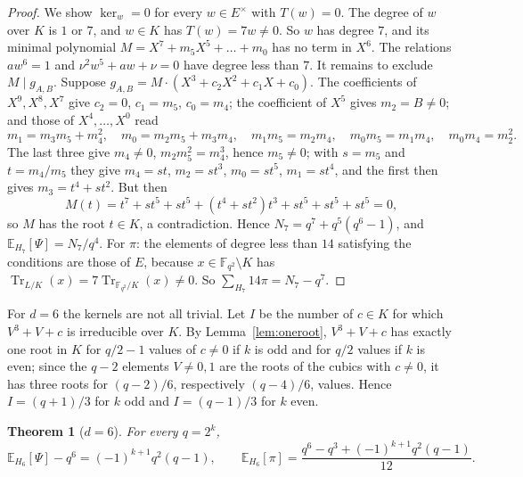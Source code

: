 \documentclass[11pt,a4paper]{amsart}
\newtheorem{theorem}{Theorem}[section]
\theoremstyle{definition}
\theoremstyle{remark}
\newcommand{\F}{\mathbb{F}}
\newcommand{\Tr}{\operatorname{Tr}}
\newcommand{\E}{\mathbb{E}}
\begin{document}
\begin{proof}
We show $\ker_w=0$ for every $w\in E^\times$ with $T(w)=0$. The degree of $w$ over $K$ is $1$ or $7$, and $w\in K$
has $T(w)=7w\ne0$. So $w$ has degree $7$, and its minimal polynomial $M=X^7+m_5X^5+\dots+m_0$ has no term in $X^6$.
The relations $aw^6=1$ and $\nu^2w^5+aw+\nu=0$ have degree less than $7$. It remains to exclude $M\mid g_{A,B}$.
Suppose $g_{A,B}=M\cdot(X^3+c_2X^2+c_1X+c_0)$. The coefficients of $X^9,X^8,X^7$ give $c_2=0$, $c_1=m_5$,
$c_0=m_4$; the coefficient of $X^5$ gives $m_2=B\ne0$; and those of $X^4,\dots,X^0$ read
\[
m_1=m_3m_5+m_4^2,\quad m_0=m_2m_5+m_3m_4,\quad m_1m_5=m_2m_4,\quad m_0m_5=m_1m_4,\quad m_0m_4=m_2^2 .
\]
The last three give $m_4\ne0$, $m_2m_5^2=m_4^3$, hence $m_5\ne0$; with $s=m_5$ and $t=m_4/m_5$ they give $m_4=st$,
$m_2=st^3$, $m_0=st^5$, $m_1=st^4$, and the first then gives $m_3=t^4+st^2$. But then
\[
M(t)=t^7+st^5+st^5+(t^4+st^2)t^3+st^5+st^5+st^5=0,
\]
so $M$ has the root $t\in K$, a contradiction. Hence $N_7=q^7+q^5(q^6-1)$, and
$\E_{H_7}[\Psi]=N_7/q^4$. For $\pi$: the elements of degree less than $14$ satisfying the conditions are those of
$E$, because $x\in\F_{q^2}\setminus K$ has $\Tr_{L/K}(x)=7\Tr_{\F_{q^2}/K}(x)\ne0$. So $\sum_{H_7}14\pi=N_7-q^7$.
\end{proof}

For $d=6$ the kernels are not all trivial. Let $I$ be the number of $c\in K$ for which $V^3+V+c$ is irreducible over
$K$. By Lemma~\ref{lem:oneroot}, $V^3+V+c$ has exactly one root in $K$ for $q/2-1$ values of $c\ne0$ if $k$ is odd
and for $q/2$ values if $k$ is even; since the $q-2$ elements $V\ne0,1$ are the roots of the cubics with $c\ne0$, it
has three roots for $(q-2)/6$, respectively $(q-4)/6$, values. Hence $I=(q+1)/3$ for $k$ odd and $I=(q-1)/3$ for
$k$ even.

\begin{theorem}[$d=6$]\label{prop:d6}
For every $q=2^k$,
\[
\E_{H_6}[\Psi]-q^6=(-1)^{k+1}q^2(q-1),\qquad \E_{H_6}[\pi]=\frac{q^6-q^3+(-1)^{k+1}q^2(q-1)}{12} .
\]
\end{theorem}
\end{document}
